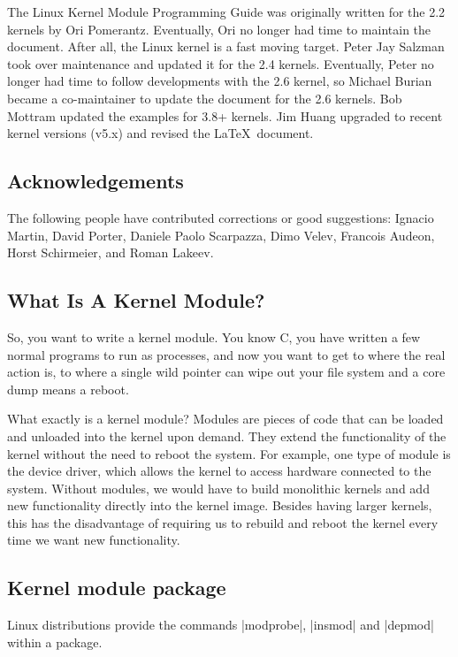 \documentclass[10pt, oneside]{book}
\begin{document}
The Linux Kernel Module Programming Guide was originally written for the 2.2 kernels by Ori Pomerantz.
Eventually, Ori no longer had time to maintain the document.
After all, the Linux kernel is a fast moving target.
Peter Jay Salzman took over maintenance and updated it for the 2.4 kernels.
Eventually, Peter no longer had time to follow developments with the 2.6 kernel, so Michael Burian became a co-maintainer to update the document for the 2.6 kernels.
Bob Mottram updated the examples for 3.8+ kernels.
Jim Huang upgraded to recent kernel versions (v5.x) and revised the \LaTeX\ document.

\subsection{Acknowledgements}
\label{sec:acknowledgements}

The following people have contributed corrections or good suggestions: Ignacio Martin, David Porter, Daniele Paolo Scarpazza, Dimo Velev, Francois Audeon, Horst Schirmeier, and Roman Lakeev.

\subsection{What Is A Kernel Module?}
\label{sec:kernelmod}

So, you want to write a kernel module.
You know C, you have written a few normal programs to run as processes, and now you want to get to where the real action is, to where a single wild pointer can wipe out your file system and a core dump means a reboot.

What exactly is a kernel module?
Modules are pieces of code that can be loaded and unloaded into the kernel upon demand.
They extend the functionality of the kernel without the need to reboot the system.
For example, one type of module is the device driver, which allows the kernel to access hardware connected to the system.
Without modules, we would have to build monolithic kernels and add new functionality directly into the kernel image.
Besides having larger kernels, this has the disadvantage of requiring us to rebuild and reboot the kernel every time we want new functionality.

\subsection{Kernel module package}
\label{sec:packages}

Linux distributions provide the commands \sh|modprobe|, \sh|insmod| and \sh|depmod| within a package.
\end{document}

